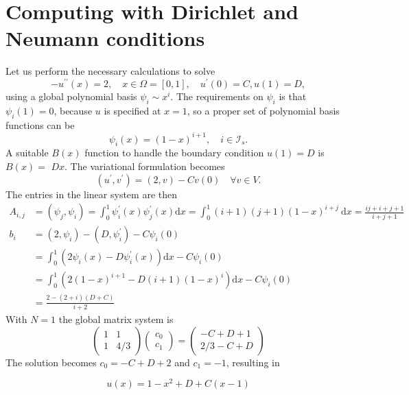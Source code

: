 \documentclass[../main.tex]{subfiles}
\begin{document}
	\section[Computing with Dirichlet and Neumann conditions]{Computing with Dirichlet and Neumann conditions}
	\label{sec:sec_12_4}
		\noindent Let us perform the necessary calculations to solve
		$$
		-u^{\prime \prime}(x)=2, \quad x \in \Omega=[0,1], \quad u^{\prime}(0)=C, u(1)=D,
		$$
		using a global polynomial basis $\psi_{i} \sim x^{i}$. The requirements on $\psi_{i}$ is that $\psi_{i}(1)=0$, because $u$ is specified at $x=1$, so a proper set of polynomial basis functions can be
		$$
		\psi_{i}(x)=(1-x)^{i+1}, \quad i \in \mathcal{I}_{s} .
		$$
		A suitable $B(x)$ function to handle the boundary condition $u(1)=D$ is $B(x)=$ $D x$. The variational formulation becomes
		$$
		\left(u^{\prime}, v^{\prime}\right)=(2, v)-C v(0) \quad \forall v \in V .
		$$
		The entries in the linear system are then
		$$
		\begin{aligned}
			A_{i, j} &=\left(\psi_{j}, \psi_{i}\right)=\int_{0}^{1} \psi_{i}^{\prime}(x) \psi_{j}^{\prime}(x) \mathrm{d} x=\int_{0}^{1}(i+1)(j+1)(1-x)^{i+j} \mathrm{~d} x=\frac{i j+i+j+1}{i+j+1} \\
			b_{i} &=\left(2, \psi_{i}\right)-\left(D, \psi_{i}^{\prime}\right)-C \psi_{i}(0) \\
			&=\int_{0}^{1}\left(2 \psi_{i}(x)-D \psi_{i}^{\prime}(x)\right) \mathrm{d} x-C \psi_{i}(0) \\
			&=\int_{0}^{1}\left(2(1-x)^{i+1}-D(i+1)(1-x)^{i}\right) \mathrm{d} x-C \psi_{i}(0) \\
			&=\frac{2-(2+i)(D+C)}{i+2}
		\end{aligned}
		$$\smallbreak 
		With $N=1$ the global matrix system is
		$$
		\left(\begin{array}{cc}
			1 & 1 \\
			1 & 4 / 3
		\end{array}\right)\left(\begin{array}{c}
			c_{0} \\
			c_{1}
		\end{array}\right)=\left(\begin{array}{c}
			-C+D+1 \\
			2 / 3-C+D
		\end{array}\right)
		$$
		The solution becomes $c_{0}=-C+D+2$ and $c_{1}=-1$, resulting in
		
		\begin{equation}
		\label{eqa169}
			u(x)=1-x^{2}+D+C(x-1)
		\end{equation}
			
\end{document}
